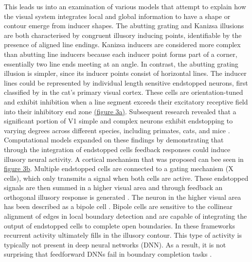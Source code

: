 \documentclass[12pt]{article}
\begin{document}
This leads us into an examination of various models that attempt to explain how the visual system integrates local and global information to have a shape or contour emerge from inducer shapes. The abutting grating and Kanizsa illusions are both characterised by congruent illusory inducing points, identifiable by the presence of aligned line endings. Kanizsa inducers are considered more complex than abutting line inducers because each inducer point forms part of a corner, essentially two line ends meeting at an angle. In contrast, the abutting grating illusion is simpler, since its inducer points consist of horizontal lines. The inducer lines could be represented by individual length sensitive endstopped neurons, first classified by \textcite{hubelRECEPTIVEFIELDSFUNCTIONAL1965} in the cat's primary visual cortex. These cells are orientation-tuned and exhibit inhibition when a line segment exceeds their excitatory receptive field into their inhibitory end zone \hyperref[fig:endstop_mechanism]{(figure 3a)}. Subsequent research revealed that a significant portion of V1 simple and complex neurons exhibit endstopping to varying degrees across different species, including primates, cats, and mice \autocite{deangelisLengthWidthTuning1994,jonesSurroundSuppressionPrimate2001,sceniakVisualSpatialCharacterization2001}. Computational models expanded on these findings by demonstrating that through the integration of endstopped cells feedback responses could induce illusory neural activity. A cortical mechanism that was proposed can bee seen in \hyperref[fig:endstop_mechanism]{figure 3b}. Multiple endstopped cells are connected to a gating mechanism (X cells), which only transmits a signal when both cells are active. These endstopped signals are then summed in a higher visual area and through feedback an orthogonal illusory response is generated \autocite{vonderheydtIllusoryContoursCortical1984}. The neuron in the higher visual area has been described as a bipole cell \autocite{grossbergRoleIllusoryContours1987}.  Bipole cells are sensitive to the collinear alignment of edges in local boundary detection and are capable of integrating the output of endstopped cells to complete open boundaries. In these frameworks recurrent activity ultimately fills in the illusory contour. This type of activity is typically not present in deep neural networks (DNN). As a result, it is not surprising that feedforward DNNs fail in boundary completion tasks \autocite{fanChallengingDeepLearning2023}.  
\end{document}
